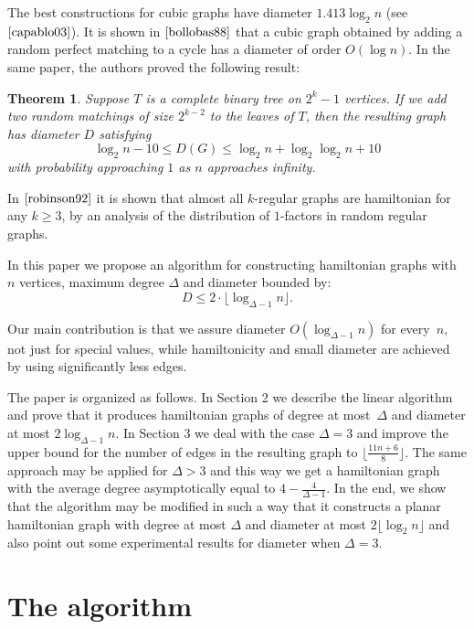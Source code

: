 \documentclass[10pt,a4paper]{article}
\newtheorem{te}{Theorem}[section]
\newcommand{\rz}{\vspace{0.1cm}}
\begin{document}
The best constructions for cubic graphs have diameter $1.413 \log_2
n$ (see $\cite{capablo03}$). It is shown in $\cite{bollobas88}$ that
a cubic graph obtained by adding a random perfect matching to a
cycle has a diameter of order $O (\log n)$. In the same paper, the
authors proved the following result:

\begin{te}
    Suppose $T$ is a complete binary tree on $2^k - 1$ vertices. If
    we add two random matchings of size $2^{k - 2}$ to the leaves of
    $T$, then the resulting graph has diameter $D$ satisfying
    $$\log_2 n - 10 \leqslant D (G) \leqslant \log_2 n + \log_2
    \log_2 n + 10$$
    with probability approaching $1$ as $n$ approaches infinity.
\end{te}

In $\cite{robinson92}$ it is shown that almost all $k$-regular
graphs are hamiltonian for any $k \geqslant 3$, by an analysis of
the distribution of $1$-factors in random regular graphs. \rz


In this paper we propose an algorithm for constructing hamiltonian
graphs with $n$ vertices, maximum degree $\Delta$ and diameter
bounded by:
$$D \leqslant 2 \cdot \lfloor \log_{\Delta - 1} n \rfloor.$$

Our main contribution is that we assure diameter $O (\log_{\Delta -
1} n)$ for every~$n$, not just for special values, while
hamiltonicity and small diameter are achieved by using significantly
less edges. \rz

The paper is organized as follows. In Section 2 we describe the
linear algorithm and prove that it produces hamiltonian graphs of
degree at most~$\Delta$ and diameter at most $2\log_{\Delta-1} n$.
In Section 3 we deal with the case $\Delta = 3$ and improve the
upper bound for the number of edges in the resulting graph to
$\lfloor \frac{11n+6}{8}\rfloor$. The same approach may be applied
for $\Delta > 3$ and this way we get a hamiltonian graph with the
average degree asymptotically equal to $4 - \frac{4}{\Delta - 1}$.
In the end, we show that the algorithm may be modified in such a way
that it constructs a planar hamiltonian graph with degree at most
$\Delta$ and diameter at most $2 \lfloor \log_2 n \rfloor$ and also
point out some experimental results for diameter when $\Delta = 3$.


\section{The algorithm}
\end{document}
